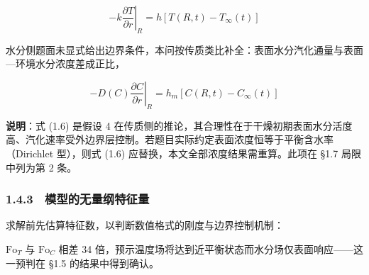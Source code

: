 \documentclass[12pt,a4paper]{ctexart}
\begin{document}
\begin{equation}
-k\left.\frac{\partial T}{\partial r}\right|_{R}=h\left[T(R,t)-T_\infty(t)\right]
\tag{1.5}
\end{equation}

水分侧题面未显式给出边界条件，本问按传质类比补全：表面水分汽化通量与表面—环境水分浓度差成正比，

\begin{equation}
-D(C)\left.\frac{\partial C}{\partial r}\right|_{R}=h_m\left[C(R,t)-C_\infty(t)\right]
\tag{1.6}
\end{equation}

\textbf{说明}：式 (1.6) 是假设 4 在传质侧的推论，其合理性在于干燥初期表面水分活度高、汽化速率受外边界层控制。若题目实际约定表面浓度恒等于平衡含水率（Dirichlet 型），则式 (1.6) 应替换，本文全部浓度结果需重算。此项在 §1.7 局限中列为第 2 条。

\subsubsection*{1.4.3　模型的无量纲特征量}

求解前先估算特征数，以判断数值格式的刚度与边界控制机制：

\begin{table}[H]
\centering
\caption{无量纲特征量}
\end{table}

$\mathrm{Fo}_T$ 与 $\mathrm{Fo}_C$ 相差 34 倍，预示温度场将达到近平衡状态而水分场仅表面响应——这一预判在 §1.5 的结果中得到确认。
\end{document}

